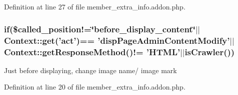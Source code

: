 Definition at line 27 of file member\-\_\-extra\-\_\-info.\-addon.\-php.

\hypertarget{member__extra__info_8addon_8php_a29031816e50a8f742422e671b2bef9b2}{
\subsubsection[{if}]{\setlength{\rightskip}{0pt plus 5cm}if(\$called\-\_\-position!=\char`\"{}before\-\_\-display\-\_\-content\char`\"{}$|$$|$Context\-::get('act')== 'disp\-Page\-Admin\-Content\-Modify'$|$$|${\bf Context\-::get\-Response\-Method}()!= 'H\-T\-M\-L'$|$$|${\bf is\-Crawler}())}}\label{member__extra__info_8addon_8php_a29031816e50a8f742422e671b2bef9b2}
Just before displaying, change image name/ image mark 

Definition at line 20 of file member\-\_\-extra\-\_\-info.\-addon.\-php.

